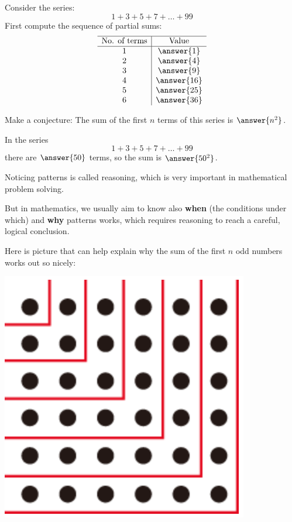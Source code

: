 \documentclass[nooutcomes]{ximera}
\begin{document}
\begin{problem}
Consider the series: 
\[
1+3+5+7+\dots+99
\]
First compute the sequence of partial sums: 
\[
\begin{array}{c|c} \hline
\text{No. of terms} & \text{Value} \\ \hline
1 & \answer{1} \\
2 & \answer{4} \\
3 & \answer{9}\\
4 & \answer{16}\\
5 & \answer{25}\\
6 & \answer{36}\\
\end{array}
\]
\begin{problem}
Make a conjecture: The sum of the first $n$ terms of this series is $\answer{n^2}$. 

In the series
\[
1+3+5+7+\dots+99
\]
there are $\answer{50}$ terms, so the sum is $\answer{50^2}$.  

\begin{problem}
Noticing patterns is called 
reasoning, which is very important in mathematical problem solving. 

But in mathematics, we usually aim to know also \textbf{when} (the conditions under which) and \textbf{why} patterns works, which requires  
 reasoning to reach a careful, logical conclusion.  

Here is picture that can help explain why the sum of the first $n$ odd numbers works out so nicely: 
\begin{image}
\includegraphics[scale=0.5]{sumOdds.png}
\end{image}


\end{problem}
\end{problem}
\end{problem}
\end{document}

